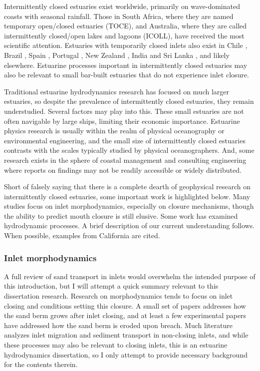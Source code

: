Intermittently closed estuaries exist worldwide, primarily on wave-dominated coasts with seasonal rainfall. Those in South Africa, where they are named temporary open/closed estuaries (TOCE), and Australia, where they are called intermittently closed/open lakes and lagoons (ICOLL), have received the most scientific attention. Estuaries with temporarily closed inlets also exist in Chile \parencite{dussaillant_water_2009}, Brazil \parencite{suzuki_effects_1998}, Spain \parencite{moreno_morphodynamics_2010}, Portugal \parencite{fortunato_morphological_2014}, New Zealand \parencite{schallenberg_contrasting_2010}, India and Sri Lanka \parencite{ranasinghe_seasonal_2003}, and likely elsewhere. Estuarine processes important in intermittently closed estuaries may also be relevant to small bar-built estuaries that do not experience inlet closure. 

Traditional estuarine hydrodynamics research has focused on much larger estuaries, so despite the prevalence of intermittently closed estuaries, they remain understudied.  Several factors may play into this. These small estuaries are not often navigable by large ships, limiting their economic importance. Estuarine physics research is usually within the realm of physical oceanography or environmental engineering, and the small size of intermittently closed estuaries contrasts with the scales typically studied by physical oceanographers. And, some research exists in the sphere of coastal management and consulting engineering where reports on findings may not be readily accessible or widely distributed.

Short of falsely saying that there is a complete dearth of geophysical research on intermittently closed estuaries, some important work is highlighted below. Many studies focus on inlet morphodynamics, especially on closure mechanisms, though the ability to predict mouth closure is still elusive. Some work has examined hydrodynamic processes. A brief description of our current understanding follows. When possible, examples from California are cited.

\subsubsection{Inlet morphodynamics}

A full review of sand transport in inlets would overwhelm the intended purpose of this introduction, but I will attempt a quick summary relevant to this dissertation research. Research on morphodynamics tends to focus on inlet closing and conditions setting this closure. A small set of papers addresses how the sand berm grows after inlet closing, and at least a few experimental papers have addressed how the sand berm is eroded upon breach. Much literature analyzes inlet migration and sediment transport in non-closing inlets, and while these processes may also be relevant to closing inlets, this is an estuarine hydrodynamics dissertation, so I only attempt to provide necessary background for the contents therein.


